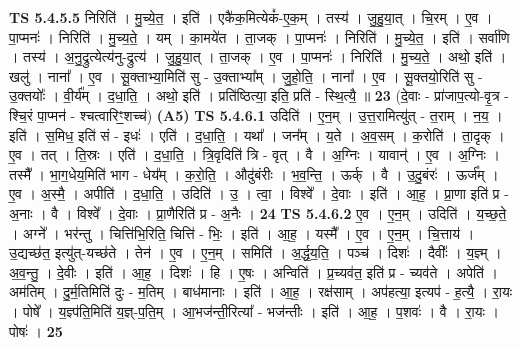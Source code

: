 \documentclass[17pt]{extarticle}
\begin{document}
                  \newline
                                \textbf{ TS 5.4.5.5} \newline
                  निरिति॑ । मु॒च्ये॒त॒ । इति॑ । एकै॑क॒मित्येकं᳚-ए॒क॒म् । तस्य॑ । जु॒हु॒या॒त् । चि॒रम् । ए॒व । पा॒प्मनः॑ । निरिति॑ । मु॒च्य॒ते॒ । यम् । का॒मये॑त । ता॒जक् । पा॒प्मनः॑ । निरिति॑ । मु॒च्ये॒त॒ । इति॑ । सर्वा॑णि । तस्य॑ । अ॒नु॒द्रुत्येत्य॑नु-द्रुत्य॑ । जु॒हु॒या॒त् । ता॒जक् । ए॒व । पा॒प्मनः॑ । निरिति॑ । मु॒च्य॒ते॒ । अथो॒ इति॑ । खलु॑ । नाना᳚ । ए॒व । सू॒क्ताभ्या॒मिति॑ सु - उ॒क्ताभ्या᳚म् । जु॒हो॒ति॒ । नाना᳚ । ए॒व । सू॒क्तयो॒रिति॑ सु - उ॒क्तयोः᳚ । वी॒र्य᳚म् । द॒धा॒ति॒ । अथो॒ इति॑ । प्रति॑ष्ठित्या॒ इति॒ प्रति॑ - स्थि॒त्यै॒ ॥ \textbf{  23 } \newline
                  \newline
                      (दे॒वाः - प्रा॑जाप॒त्यो-वृ॒त्र - श्चि॒रं पा॒प्मन॑ - श्चत्वारिꣳ॒॒शच्च॑)  \textbf{(A5)} \newline \newline
                                \textbf{ TS 5.4.6.1} \newline
                  उदिति॑ । ए॒न॒म् । उ॒त्त॒रामित्यु॑त् - त॒राम् । न॒य॒ । इति॑ । स॒मिध॒ इति॑ सं - इधः॑ । एति॑ । द॒धा॒ति॒ । यथा᳚ । जन᳚म् । य॒ते । अ॒व॒सम् । क॒रोति॑ । ता॒दृक् । ए॒व । तत् । ति॒स्रः । एति॑ । द॒धा॒ति॒ । त्रि॒वृदिति॑ त्रि - वृत् । वै । अ॒ग्निः । यावान्॑ । ए॒व । अ॒ग्निः । तस्मै᳚ । भा॒ग॒धेय॒मिति॑ भाग - धेय᳚म् । क॒रो॒ति॒ । औदु॑बंरीः । भ॒व॒न्ति॒ । ऊर्क् । वै । उ॒दु॒बंरः॑ । ऊर्ज᳚म् । ए॒व । अ॒स्मै॒ । अपीति॑ । द॒धा॒ति॒ । उदिति॑ । उ॒ । त्वा॒ । विश्वे᳚ । दे॒वाः । इति॑ । आ॒ह॒ । प्रा॒णा इति॑ प्र - अ॒नाः । वै । विश्वे᳚ । दे॒वाः । प्रा॒णैरिति॑ प्र - अ॒नैः । \textbf{  24} \newline
                  \newline
                                \textbf{ TS 5.4.6.2} \newline
                  ए॒व । ए॒न॒म् । उदिति॑ । य॒च्छ॒ते॒ । अग्ने᳚ । भर॑न्तु । चित्ति॑भि॒रिति॒ चित्ति॑ - भिः॒ । इति॑ । आ॒ह॒ । यस्मै᳚ । ए॒व । ए॒न॒म् । चि॒त्ताय॑ । उ॒द्यच्छ॑त॒ इत्यु॑त्-यच्छ॑ते । तेन॑ । ए॒व । ए॒न॒म् । समिति॑ । अ॒र्द्ध॒य॒ति॒ । पञ्च॑ । दिशः॑ । दैवीः᳚ । य॒ज्ञ्म् । अ॒व॒न्तु॒ । दे॒वीः । इति॑ । आ॒ह॒ । दिशः॑ । हि । ए॒षः । अन्विति॑ । प्र॒च्यव॑त॒ इति॑ प्र - च्यव॑ते । अपेति॑ । अम॑तिम् । दु॒र्म॒तिमिति॑ दुः - म॒तिम् । बाध॑मानाः । इति॑ । आ॒ह॒ । रक्ष॑साम् । अप॑हत्या॒ इत्यप॑ - ह॒त्यै॒ । रा॒यः । पोषे᳚ । य॒ज्ञ्प॑ति॒मिति॑ य॒ज्ञ्-प॒ति॒म् । आ॒भज॑न्ती॒रित्या᳚ - भज॑न्तीः । इति॑ । आ॒ह॒ । प॒शवः॑ । वै । रा॒यः । पोषः॑ । \textbf{  25} \newline
\end{document}
